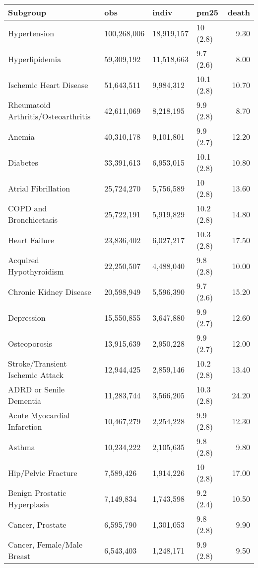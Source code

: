 \begin{table}[ht]
\centering
\begin{tabular}{llllr}
  \hline
Subgroup & obs & indiv & pm25 & death \\ 
  \hline
Hypertension & 100,268,006 & 18,919,157 & 10 (2.8) & 9.30 \\ 
  Hyperlipidemia & 59,309,192 & 11,518,663 & 9.7 (2.6) & 8.00 \\ 
  Ischemic Heart Disease & 51,643,511 & 9,984,312 & 10.1 (2.8) & 10.70 \\ 
  Rheumatoid Arthritis/Osteoarthritis & 42,611,069 & 8,218,195 & 9.9 (2.8) & 8.70 \\ 
  Anemia & 40,310,178 & 9,101,801 & 9.9 (2.7) & 12.20 \\ 
  Diabetes & 33,391,613 & 6,953,015 & 10.1 (2.8) & 10.80 \\ 
  Atrial Fibrillation & 25,724,270 & 5,756,589 & 10 (2.8) & 13.60 \\ 
  COPD and Bronchiectasis & 25,722,191 & 5,919,829 & 10.2 (2.8) & 14.80 \\ 
  Heart Failure & 23,836,402 & 6,027,217 & 10.3 (2.8) & 17.50 \\ 
  Acquired Hypothyroidism & 22,250,507 & 4,488,040 & 9.8 (2.8) & 10.00 \\ 
  Chronic Kidney Disease & 20,598,949 & 5,596,390 & 9.7 (2.6) & 15.20 \\ 
  Depression & 15,550,855 & 3,647,880 & 9.9 (2.7) & 12.60 \\ 
  Osteoporosis & 13,915,639 & 2,950,228 & 9.9 (2.7) & 12.00 \\ 
  Stroke/Transient Ischemic Attack & 12,944,425 & 2,859,146 & 10.2 (2.8) & 13.40 \\ 
  ADRD or Senile Dementia & 11,283,744 & 3,566,205 & 10.3 (2.8) & 24.20 \\ 
  Acute Myocardial Infarction & 10,467,279 & 2,254,228 & 9.9 (2.8) & 12.30 \\ 
  Asthma & 10,234,222 & 2,105,635 & 9.8 (2.8) & 9.80 \\ 
  Hip/Pelvic Fracture & 7,589,426 & 1,914,226 & 10 (2.8) & 17.00 \\ 
  Benign Prostatic Hyperplasia & 7,149,834 & 1,743,598 & 9.2 (2.4) & 10.50 \\ 
  Cancer, Prostate & 6,595,790 & 1,301,053 & 9.8 (2.8) & 9.90 \\ 
  Cancer, Female/Male Breast & 6,543,403 & 1,248,171 & 9.9 (2.8) & 9.50 \\ 

\end{tabular}
\end{table}
